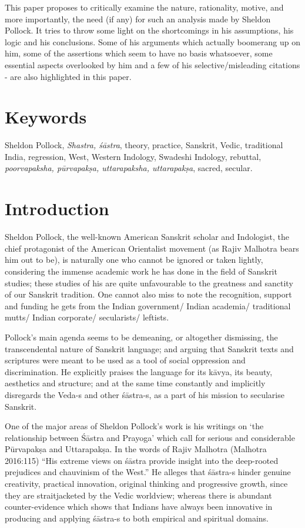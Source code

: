 This paper proposes to critically examine the nature, rationality, motive, and more importantly, the need (if any) for such an analysis made by Sheldon Pollock. It tries to throw some light on the shortcomings in his assumptions, his logic and his conclusions. Some of his arguments which actually boomerang up on him, some of the assertions which seem to have no basis whatsoever, some essential aspects overlooked by him and a few of his selective/misleading citations - are also highlighted in this paper. 

\vskip -12pt

\section*{Keywords}

Sheldon Pollock, \textit{Shastra, śāstra}, theory, practice, Sanskrit, Vedic, traditional India, regression, West, Western Indology, Swadeshi Indology, rebuttal, \textit{poorvapaksha, pūrvapakṣa, uttarapaksha, uttarapakṣa}, sacred, secular.

\vskip -12pt

\section*{Introduction}

Sheldon Pollock, the well-known American Sanskrit scholar and Indologist, the chief protagonist of the American Orientalist movement (as Rajiv Malhotra bears him out to be), is naturally one who cannot be ignored or taken lightly, considering the immense academic work he has done in the field of Sanskrit studies; these studies of his are quite unfavourable to the greatness and sanctity of our Sanskrit tradition. One cannot also miss to note the recognition, support and funding he gets from the Indian government/ Indian academia/ traditional mutts/ Indian corporate/ secularists/ leftists.

Pollock's main agenda seems to be demeaning, or altogether dismissing, the transcendental nature of Sanskrit language; and arguing that Sanskrit texts and scriptures were meant to be used as a tool of social oppression and discrimination. He explicitly praises the language for its kāvya, its beauty, aesthetics and structure; and at the same time constantly and implicitly disregards the Veda-s and other śāstra-s, as a part of his mission to secularise Sanskrit. 

One of the major areas of Sheldon Pollock's work is his writings on `the relationship between Śāstra and Prayoga' which call for serious and considerable Pūrvapakṣa and Uttarapakṣa. In the words of Rajiv Malhotra (Malhotra 2016:115) ``His extreme views on śāstra provide insight into the deep-rooted prejudices and chauvinism of the West.'' He alleges that śāstra-s hinder genuine creativity, practical innovation, original thinking and progressive growth, since they are straitjacketed by the Vedic worldview; whereas there is abundant counter-evidence which shows that Indians have always been innovative in producing and applying śāstra-s to both empirical and spiritual domains.

